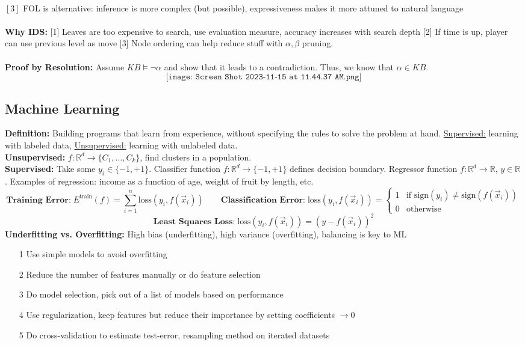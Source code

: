 \\
$[3]$ FOL is alternative: inference is more complex (but possible), expressiveness makes it more attuned to natural language\\
\\
\textbf{Why IDS:} [1] Leaves are too expensive to search, use evaluation measure, accuracy increases with search depth [2] If time is up, player can use previous level as move [3] Node ordering can help reduce stuff with $\alpha, \beta$ pruning.\\
\\
\textbf{Proof by Resolution:} Assume $KB \vDash \neg\alpha$ and show that it leads to a contradiction. Thus, we know that $\alpha \in KB$.
$$
\texttt{[image: Screen Shot 2023-11-15 at 11.44.37 AM.png]}
$$
\subsection{Machine Learning}
\textbf{Definition:} Building programs that learn from experience, without specifying the rules to solve the problem at hand. \underline{Supervised:} learning with labeled data, \underline{Unsupervised:} learning with unlabeled data.\\
\textbf{Unsupervised:} $f: \mathbb{R}^d \rightarrow \{C_1,\dots,C_k\}$, find clusters in a population.\\
\textbf{Supervised:} Take some $y_i \in \{-1,+1\}$. Classifier function $f: \mathbb{R}^d \rightarrow \{-1,+1\}$ defines decision boundary. Regressor function $f: \mathbb{R}^d \rightarrow \mathbb{R}$, $y \in \mathbb{R}$. Examples of regression: income as a function of age, weight of fruit by length, etc.\\
$$
\textbf{Training Error:}\;E^{\text{train}}(f) = \sum_{i=1}^n \text{loss}(y_i,f(\vec{x}_i)) \quad \quad \textbf{Classification Error:}\;\text{loss}(y_i,f(\vec{x}_i)) = \begin{cases}
    1 &\text{if sign}(y_i) \neq \text{sign}(f(\vec{x}_i))\\
    0 &\text{otherwise}
\end{cases}
$$
$$
\textbf{Least Squares Loss:}\;\text{loss}(y_i,f(\vec{x}_i)) = (y-f(\vec{x}_i))^2
$$
\textbf{Underfitting vs. Overfitting:} High bias (underfitting), high variance (overfitting), balancing is key to ML
\begin{itemize}
    \item [1] Use simple models to avoid overfitting\\
    \item [2] Reduce the number of features manually or do feature selection\\
    \item [3] Do model selection, pick out of a list of models based on performance\\
    \item [4] Use regularization, keep features but reduce their importance by setting coefficients $\rightarrow 0$\\
    \item [5] Do cross-validation to estimate test-error, resampling method on iterated datasets\\
\end{itemize}
